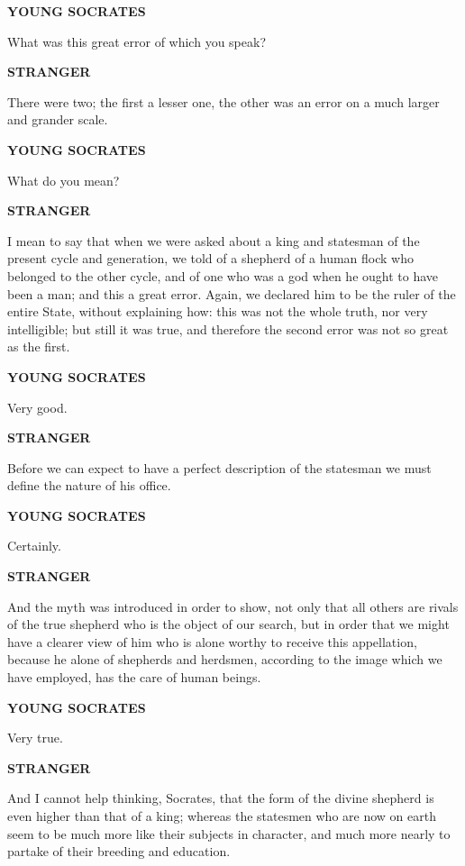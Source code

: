 \documentclass[11pt,letter]{article}
\begin{document}
\par \textbf{YOUNG SOCRATES}
\par   What was this great error of which you speak?

\par \textbf{STRANGER}
\par   There were two; the first a lesser one, the other was an error on a much larger and grander scale.

\par \textbf{YOUNG SOCRATES}
\par   What do you mean?

\par \textbf{STRANGER}
\par   I mean to say that when we were asked about a king and statesman of the present cycle and generation, we told of a shepherd of a human flock who belonged to the other cycle, and of one who was a god when he ought to have been a man; and this a great error. Again, we declared him to be the ruler of the entire State, without explaining how:  this was not the whole truth, nor very intelligible; but still it was true, and therefore the second error was not so great as the first.

\par \textbf{YOUNG SOCRATES}
\par   Very good.

\par \textbf{STRANGER}
\par   Before we can expect to have a perfect description of the statesman we must define the nature of his office.

\par \textbf{YOUNG SOCRATES}
\par   Certainly.

\par \textbf{STRANGER}
\par   And the myth was introduced in order to show, not only that all others are rivals of the true shepherd who is the object of our search, but in order that we might have a clearer view of him who is alone worthy to receive this appellation, because he alone of shepherds and herdsmen, according to the image which we have employed, has the care of human beings.

\par \textbf{YOUNG SOCRATES}
\par   Very true.

\par \textbf{STRANGER}
\par   And I cannot help thinking, Socrates, that the form of the divine shepherd is even higher than that of a king; whereas the statesmen who are now on earth seem to be much more like their subjects in character, and much more nearly to partake of their breeding and education.
\end{document}
